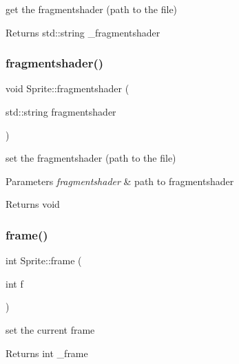 get the fragmentshader (path to the file) 

\begin{DoxyReturn}{Returns}
std\+::string \+\_\+fragmentshader 
\end{DoxyReturn}
\mbox{\label{class_sprite_a7934a50c082a996333a02d5d8196cfa3}} 
\subsubsection{\texorpdfstring{fragmentshader()}{fragmentshader()}\hspace{0.1cm}{\footnotesize\ttfamily [2/2]}}
{\footnotesize\ttfamily void Sprite\+::fragmentshader (\begin{DoxyParamCaption}\item[{std\+::string}]{fragmentshader }\end{DoxyParamCaption})\hspace{0.3cm}{\ttfamily [inline]}}



set the fragmentshader (path to the file) 


\begin{DoxyParams}{Parameters}
{\em fragmentshader} & path to fragmentshader \\
\hline
\end{DoxyParams}
\begin{DoxyReturn}{Returns}
void 
\end{DoxyReturn}
\mbox{\label{class_sprite_a150a85459279f9ef94eac9376736cab0}} 
\subsubsection{\texorpdfstring{frame()}{frame()}\hspace{0.1cm}{\footnotesize\ttfamily [1/2]}}
{\footnotesize\ttfamily int Sprite\+::frame (\begin{DoxyParamCaption}\item[{int}]{f }\end{DoxyParamCaption})}



set the current frame 

\begin{DoxyReturn}{Returns}
int \+\_\+frame 
\end{DoxyReturn}
\mbox{\label{class_sprite_a59437773b51f5c9abba5c8dabd2fbdb4}} 
